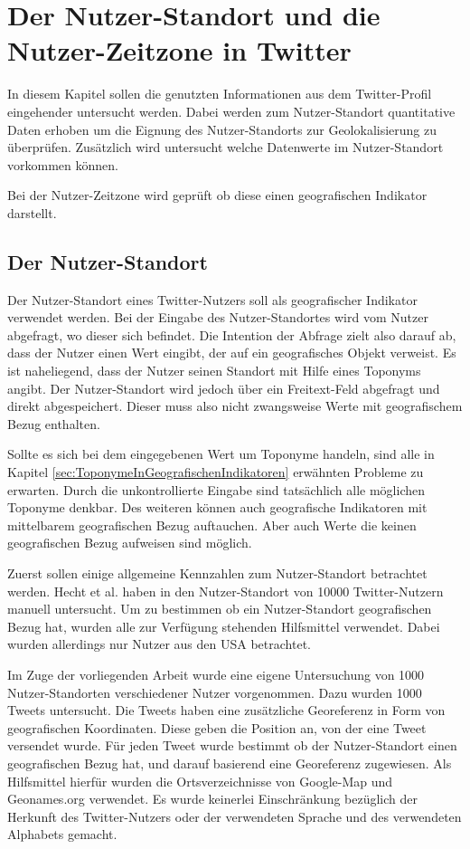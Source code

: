 	\section{Der Nutzer-Standort und die Nutzer-Zeitzone in Twitter}

		In diesem Kapitel sollen die genutzten Informationen aus dem Twitter-Profil eingehender untersucht werden.
		Dabei werden zum Nutzer-Standort quantitative Daten erhoben um die Eignung des Nutzer-Standorts zur Geolokalisierung zu überprüfen.
		Zusätzlich wird untersucht welche Datenwerte im Nutzer-Standort vorkommen können.

		Bei der Nutzer-Zeitzone wird geprüft ob diese einen geografischen Indikator darstellt. 

		\subsection{Der Nutzer-Standort} \label{subsec:nutzerStandort} 

			Der Nutzer-Standort eines Twitter-Nutzers soll als geografischer Indikator verwendet werden.
			Bei der Eingabe des Nutzer-Standortes wird vom Nutzer abgefragt, wo dieser sich befindet. 
			Die Intention der Abfrage zielt also darauf ab, dass der Nutzer einen Wert eingibt, der auf ein geografisches Objekt verweist. 
			Es ist naheliegend, dass der Nutzer seinen Standort mit Hilfe eines Toponyms angibt.
			Der Nutzer-Standort wird jedoch über ein Freitext-Feld abgefragt und direkt abgespeichert.
			Dieser muss also nicht zwangsweise Werte mit geografischem Bezug enthalten. 

			Sollte es sich bei dem eingegebenen Wert um Toponyme handeln, sind alle in Kapitel \ref{sec:ToponymeInGeografischenIndikatoren} erwähnten Probleme zu erwarten.
			Durch die unkontrollierte Eingabe sind tatsächlich alle möglichen Toponyme denkbar.
			Des weiteren können auch geografische Indikatoren mit mittelbarem geografischen Bezug auftauchen.
			Aber auch Werte die keinen geografischen Bezug aufweisen sind möglich.	

			Zuerst sollen einige allgemeine Kennzahlen zum Nutzer-Standort betrachtet werden.
			Hecht et al. haben in \cite{Hecht2011} den Nutzer-Standort von 10000 Twitter-Nutzern manuell untersucht.
			Um zu bestimmen ob ein Nutzer-Standort geografischen Bezug hat, wurden alle zur Verfügung stehenden Hilfsmittel verwendet.
			Dabei wurden allerdings nur Nutzer aus den USA betrachtet.

			Im Zuge der vorliegenden Arbeit wurde eine eigene Untersuchung von 1000 Nutzer-Standorten verschiedener Nutzer vorgenommen.
			Dazu wurden 1000 Tweets untersucht.
			Die Tweets haben eine zusätzliche Georeferenz in Form von geografischen Koordinaten.
			Diese geben die Position an, von der eine Tweet versendet wurde.
			Für jeden Tweet wurde bestimmt ob der Nutzer-Standort einen geografischen Bezug hat, und darauf basierend eine Georeferenz zugewiesen.
			Als Hilfsmittel hierfür wurden die Ortsverzeichnisse von Google-Map und Geonames.org verwendet.
			Es wurde keinerlei Einschränkung bezüglich der Herkunft des Twitter-Nutzers oder der verwendeten Sprache und des verwendeten Alphabets gemacht.

